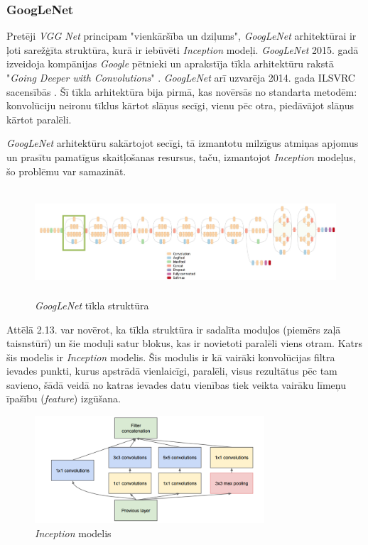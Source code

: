 \subsubsection{GoogLeNet}
Pretēji \textit{VGG Net} principam "vienkāršība un dziļums", \textit{GoogLeNet} arhitektūrai ir ļoti sarežģīta struktūra, kurā ir iebūvēti \textit{Inception} modeļi. \textit{GoogLeNet} 2015. gadā izveidoja kompānijas \textit{Google} pētnieki un aprakstīja tīkla arhitektūru rakstā "\textit{Going Deeper with Convolutions}" \cite{szegedy2015going}. \textit{GoogLeNet} arī uzvarēja 2014. gada ILSVRC sacensībās \cite{ILSVRC15}. Šī tīkla arhitektūra bija pirmā, kas novērsās no standarta metodēm: konvolūciju neironu tīklus kārtot slāņus secīgi, vienu pēc otra, piedāvājot slāņus kārtot paralēli.

\textit{GoogLeNet} arhitektūru sakārtojot secīgi, tā izmantotu milzīgus atmiņas apjomus un prasītu pamatīgus skaitļošanas resursus, taču, izmantojot \textit{Inception} modeļus, šo problēmu var samazināt.
\begin{figure}[h]%
	\centering
	\includegraphics[height=4cm]{images/GoogLeNet2.png} %
	\caption{\textit{GoogLeNet} tīkla struktūra \cite{szegedy2015going}}%
	\label{fig:example}%
\end{figure}

Attēlā 2.13. var novērot, ka tīkla struktūra ir sadalīta moduļos (piemērs zaļā taisnstūrī) un šie moduļi satur blokus, kas ir novietoti paralēli viens otram. Katrs šis modelis ir \textit{Inception} modelis. Šis modulis ir kā vairāki konvolūcijas filtra ievades punkti, kurus apstrādā vienlaicīgi, paralēli, visus rezultātus pēc tam savieno, šādā veidā no katras ievades datu vienības tiek veikta vairāku līmeņu īpašību (\textit{feature}) izgūšana.

\begin{figure}[h]%
	\centering
	\includegraphics[height=4cm]{images/inception.png} %
	\caption{\textit{Inception} modelis \cite{szegedy2015going}}%
	\label{fig:example}%
\end{figure}

